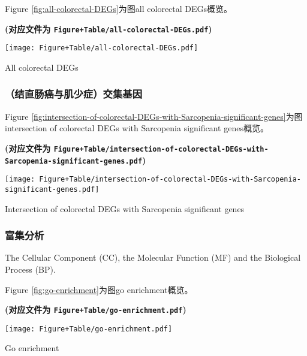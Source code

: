 \documentclass[
]{article}
\begin{document}
Figure \ref{fig:all-colorectal-DEGs}为图all colorectal DEGs概览。

\textbf{(对应文件为 \texttt{Figure+Table/all-colorectal-DEGs.pdf})}

\def\@captype{figure}
\begin{center}
\texttt{[image: Figure+Table/all-colorectal-DEGs.pdf]}
\caption{All colorectal DEGs}\label{fig:all-colorectal-DEGs}
\end{center}

\hypertarget{ux7ed3ux76f4ux80a0ux764cux4e0eux808cux5c11ux75c7ux4ea4ux96c6ux57faux56e0}{%
\subsubsection{（结直肠癌与肌少症）交集基因}\label{ux7ed3ux76f4ux80a0ux764cux4e0eux808cux5c11ux75c7ux4ea4ux96c6ux57faux56e0}}

Figure \ref{fig:intersection-of-colorectal-DEGs-with-Sarcopenia-significant-genes}为图intersection of colorectal DEGs with Sarcopenia significant genes概览。

\textbf{(对应文件为 \texttt{Figure+Table/intersection-of-colorectal-DEGs-with-Sarcopenia-significant-genes.pdf})}

\def\@captype{figure}
\begin{center}
\texttt{[image: Figure+Table/intersection-of-colorectal-DEGs-with-Sarcopenia-significant-genes.pdf]}
\caption{Intersection of colorectal DEGs with Sarcopenia significant genes}\label{fig:intersection-of-colorectal-DEGs-with-Sarcopenia-significant-genes}
\end{center}

\hypertarget{ux5bccux96c6ux5206ux6790}{%
\subsubsection{富集分析}\label{ux5bccux96c6ux5206ux6790}}

The Cellular Component (CC), the Molecular Function (MF) and the Biological Process (BP).

Figure \ref{fig:go-enrichment}为图go enrichment概览。

\textbf{(对应文件为 \texttt{Figure+Table/go-enrichment.pdf})}

\def\@captype{figure}
\begin{center}
\texttt{[image: Figure+Table/go-enrichment.pdf]}
\caption{Go enrichment}\label{fig:go-enrichment}
\end{center}
\end{document}

